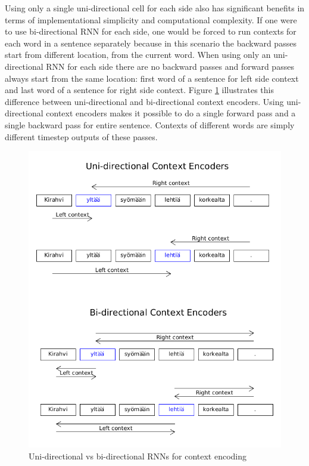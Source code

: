 \documentclass[12pt,a4paper,english
]{tutthesis}
\begin{document}
Using only a single uni-directional cell for each side also has significant benefits in terms of implementational simplicity and computational complexity. If one were to use bi-directional RNN for each side, one would be forced to run contexts for each word in a sentence separately because in this scenario the backward passes start from different location, from the current word. When using only an uni-directional RNN for each side there are no backward passes and forward passes always start from the same location: first word of a sentence for left side context and last word of a sentence for right side context. Figure \ref{figure:uni_vs_bi} illustrates this difference between uni-directional and bi-directional context encoders. Using uni-directional context encoders makes it possible to do a single forward pass and a single backward pass for entire sentence. Contexts of different words are simply different timestep outputs of these passes.

\begin{figure}[htbp]
\caption{Uni-directional vs bi-directional RNNs for context encoding}
\label{figure:uni_vs_bi}
\centering
\includegraphics[width=15cm]{uni_vs_bi.png}
\end{figure}
\end{document}
